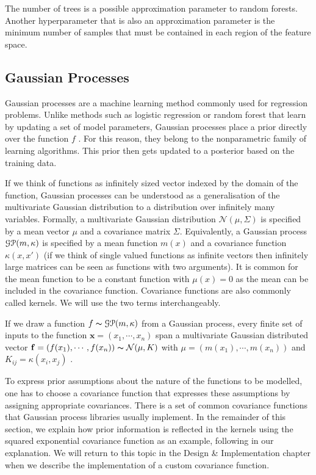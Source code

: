 \documentclass[a4paper,12pt,twoside,openright]{report}
\begin{document}
The number of trees is a possible approximation parameter to random forests. Another hyperparameter that is also an approximation parameter is the minimum number of samples that must be contained in each region of the feature space.

\subsection{Gaussian Processes}
Gaussian processes are a machine learning method commonly used for regression problems. Unlike methods such as logistic regression or random forest that learn by updating a set of model parameters, Gaussian processes place a prior directly over the function $f$ \cite{Murphy:2012:MLP:2380985}. For this reason, they belong to the nonparametric family of learning algorithms. This prior then gets updated to a posterior based on the training data.

If we think of functions as infinitely sized vector indexed by the domain of the function, Gaussian processes can be understood as a generalisation of the multivariate Gaussian distribution to a distribution over infinitely many variables. Formally, a multivariate Gaussian distribution $\mathcal{N}(\mu, \Sigma)$ is specified by a mean vector $\mu$ and a covariance matrix $\Sigma$. Equivalently, a Gaussian process $\EuScript{G}\EuScript{P}(m, \kappa)$ is specified by a mean function $m(x)$ and a covariance function $\kappa(x, x')$ (if we think of single valued functions as infinite vectors then infinitely large matrices can be seen as functions with two arguments). It is common for the mean function to be a constant function with $\mu(x) = 0$ as the mean can be included in the covariance function. Covariance functions are also commonly called kernels. We will use the two terms interchangeably.

If we draw a function $f \thicksim \EuScript{G}\EuScript{P}(m, \kappa)$ from a Gaussian process, every finite set of inputs to the function $\mathbf{x} = (x_1, \cdots, x_n)$ span a multivariate Gaussian distributed vector $\mathbf{f} = (f(x_1), \cdots, f(x_n)) \thicksim \mathcal{N}(\mu,K)$ with $\mu = (m(x_1), \cdots, m(x_n))$ and $K_{ij} = \kappa(x_i, x_j)$ \cite{Rasmussen:2005:GPM:1162254}.

To express prior assumptions about the nature of the functions to be modelled, one has to choose a covariance function that expresses these assumptions by assigning appropriate covariances. There is a set of common covariance functions that Gaussian process libraries usually implement. In the remainder of this section, we explain how prior information is reflected in the kernels using the squared exponential covariance function as an example, following \cite{duvenaudthesis} in our explanation. We will return to this topic in the Design \& Implementation chapter when we describe the implementation of a custom covariance function. 
\end{document}
